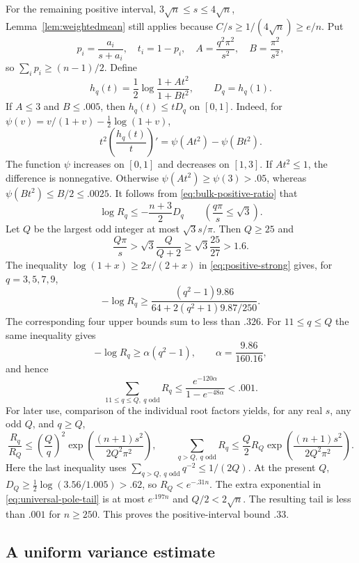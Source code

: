 For the remaining positive interval, $3\sqrt n\le s\le4\sqrt n$,
Lemma~\ref{lem:weightedmean} still applies because
$C/s\ge1/(4\sqrt n)\ge e/n$. Put
\[
 p_i=\frac{a_i}{s+a_i},\quad t_i=1-p_i,\quad
 A=\frac{q^2\pi^2}{s^2},\quad B=\frac{\pi^2}{s^2},
\]
so $\sum_i p_i\ge(n-1)/2$. Define
\[
 h_q(t)=\frac12\log\frac{1+At^2}{1+Bt^2},\qquad D_q=h_q(1).
\]
If $A\le3$ and $B\le.005$, then $h_q(t)\le tD_q$ on $[0,1]$.
Indeed, for
$\psi(v)=v/(1+v)-\tfrac12\log(1+v)$,
\[
 t^2\left(\frac{h_q(t)}t\right)'=\psi(At^2)-\psi(Bt^2).
\]
The function $\psi$ increases on $[0,1]$ and decreases on $[1,3]$.
If $At^2\le1$, the difference is nonnegative. Otherwise
$\psi(At^2)\ge\psi(3)>.05$, whereas $\psi(Bt^2)\le B/2\le.0025$.
It follows from \eqref{eq:bulk-positive-ratio} that
\begin{equation}\label{eq:positive-strong}
 \log R_q\le-\frac{n+3}{2}D_q
 \qquad\left(\frac{q\pi}{s}\le\sqrt3\right).
\end{equation}
Let $Q$ be the largest odd integer at most $\sqrt3s/\pi$. Then
$Q\ge25$ and
\[
 \frac{Q\pi}{s}>\sqrt3\frac{Q}{Q+2}
 \ge\sqrt3\frac{25}{27}>1.6.
\]
The inequality $\log(1+x)\ge2x/(2+x)$ in
\eqref{eq:positive-strong} gives, for $q=3,5,7,9$,
\[
 -\log R_q\ge
 \frac{(q^2-1)9.86}{64+2(q^2+1)9.87/250}.
\]
The corresponding four upper bounds sum to less than $.326$.
For $11\le q\le Q$ the same inequality gives
\[
 -\log R_q\ge\alpha(q^2-1),\qquad \alpha=\frac{9.86}{160.16},
\]
and hence
\[
 \sum_{11\le q\le Q,\ q\text{ odd}}R_q
 \le\frac{e^{-120\alpha}}{1-e^{-48\alpha}}<.001.
\]
For later use, comparison of the individual root factors yields, for
any real $s$, any odd $Q$, and $q\ge Q$,
\begin{equation}\label{eq:universal-pole-tail}
 \frac{R_q}{R_Q}\le\left(\frac Qq\right)^2
 \exp\!\left(\frac{(n+1)s^2}{2Q^2\pi^2}\right),\qquad
 \sum_{q>Q,\ q\text{ odd}}R_q
 \le\frac Q2R_Q\exp\!\left(\frac{(n+1)s^2}{2Q^2\pi^2}\right).
\end{equation}
Here the last inequality uses
$\sum_{q>Q,\ q\text{ odd}}q^{-2}\le1/(2Q)$.
At the present $Q$,
$D_Q\ge\tfrac12\log(3.56/1.005)>.62$, so $R_Q<e^{-.31n}$.
The extra exponential in \eqref{eq:universal-pole-tail} is at most
$e^{.197n}$ and $Q/2<2\sqrt n$. The resulting tail is less than $.001$
for $n\ge250$. This proves the positive-interval bound $.33$.

\subsection{A uniform variance estimate}

